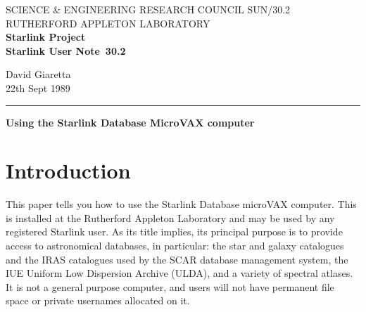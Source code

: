 \pagestyle{myheadings}

\newcommand{\stardoccategory}  {Starlink User Note}
\newcommand{\stardocinitials}  {SUN}
\newcommand{\stardocnumber}    {30.2}
\newcommand{\stardocauthors}   {David Giaretta}
\newcommand{\stardocdate}      {22th Sept 1989}
\newcommand{\stardoctitle}     {Using the Starlink Database MicroVAX computer}

\newcommand{\stardocname}{\stardocinitials /\stardocnumber}
\markright{\stardocname}
\setlength{\textwidth}{160mm}
\setlength{\textheight}{240mm}
\setlength{\topmargin}{-5mm}
\setlength{\oddsidemargin}{0mm}
\setlength{\evensidemargin}{0mm}
\setlength{\parindent}{0mm}
\setlength{\parskip}{\medskipamount}
\setlength{\unitlength}{1mm}


\thispagestyle{empty}
SCIENCE \& ENGINEERING RESEARCH COUNCIL \hfill \stardocname\\
RUTHERFORD APPLETON LABORATORY\\
{\large\bf Starlink Project\\}
{\large\bf \stardoccategory\ \stardocnumber}
\begin{flushright}
\stardocauthors\\
\stardocdate
\end{flushright}
\vspace{-4mm}
\rule{\textwidth}{0.5mm}
\vspace{5mm}
\begin{center}
{\Large\bf \stardoctitle}
\end{center}
\vspace{5mm}

\tableofcontents

\newpage
\section{Introduction}

This paper tells you how to use the Starlink Database microVAX computer.
This is installed at the Rutherford Appleton Laboratory and may be used by any
registered Starlink user.
As its title implies, its
principal purpose is to provide access to astronomical
databases, in particular: the star and galaxy catalogues and the IRAS catalogues
used by the SCAR database management system, the IUE Uniform Low Dispersion
Archive (ULDA), and a variety of spectral atlases.
It is not a general purpose computer, and users will not have permanent
file space or private usernames allocated on it.

